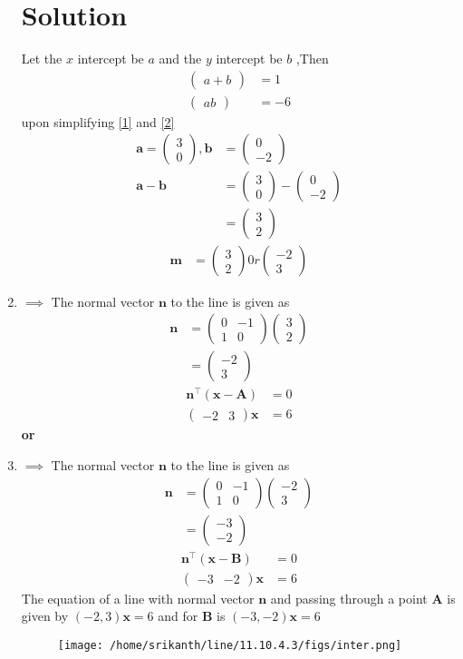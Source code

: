 \documentclass[12pt]{article}
\providecommand{\brak}[1]{\ensuremath{\left(#1\right)}}
\newcommand{\myvec}[1]{\ensuremath{\begin{pmatrix}#1\end{pmatrix}}}
\let\vec\mathbf
\begin{document}
\begin{enumerate}
\section{Solution}
Let the $x$ intercept be $a$ and  the $y$ intercept be $b$ ,Then
\begin{align}
\myvec{a+b}&=1\label{1}\\
\myvec{ab}&=-6 \label{2}
\end{align}
upon simplifying \eqref{1} and \eqref{2}
\begin{align}
\vec{a}=\myvec{3\\0},\vec{b}&=\myvec{0\\-2}\\
\vec{a-b}&=\myvec{3\\0}-\myvec{0\\-2}\\
&=\myvec{3\\2}
\end{align}
\begin{align}		
\vec{m}&=\myvec{3\\2}0r \myvec{-2\\3}
\end{align}
\item 
$\implies$ The normal vector $\vec{n}$ to the line is given as
\begin{align}
\vec{n}&=\myvec{0&-1\\1&0}\myvec{3\\2}\\
&=\myvec{-2 \\3} 
\end{align}
\begin{align}
	\vec{n}^\top\brak{\vec{x}-\vec{A}} &= 0 \\
	\myvec { -2 & 3 } \vec{x}  &= 6  
\end{align}
   \textbf{or}\\
\item 
$\implies$ The normal vector $\vec{n}$ to the line is given as
\begin{align}
\vec{n}&=\myvec{0&-1\\1&0}\myvec{-2\\3}\\
&=\myvec{-3 \\-2} 
\end{align}
\begin{align}
    \vec{n}^\top\brak{\vec{x}-\vec{B}} &= 0 \\  
	\myvec { -3 & -2 }  \vec{x}  &= 6        
\end{align}
The equation of a line with normal vector $\vec{n}$ and passing through a point $\vec{A}$ is given by $(-2,3)\vec{x}=6$ and for $\vec{B}$ is $(-3,-2)\vec{x}=6$
\begin{figure}[h!]
\centering
\texttt{[image: /home/srikanth/line/11.10.4.3/figs/inter.png]}
\caption{}
\label{fig:line segment}
\end{figure}
\end{enumerate}
\end{document}
